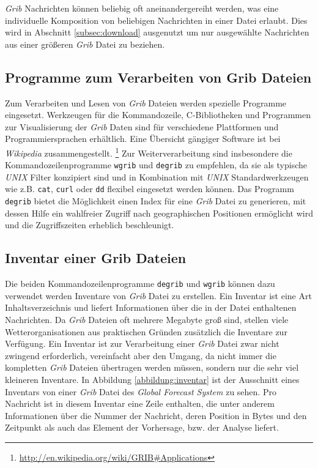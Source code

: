 \textit{Grib} Nachrichten können beliebig oft aneinandergereiht
werden, was eine individuelle Komposition von beliebigen Nachrichten
in einer Datei erlaubt. Dies wird in Abschnitt \ref{subsec:download}
ausgenutzt um nur ausgewählte Nachrichten aus einer größeren
\textit{Grib} Datei zu beziehen.

\subsection{Programme zum Verarbeiten von Grib Dateien}

Zum Verarbeiten und Lesen von \textit{Grib} Dateien werden spezielle
Programme eingesetzt. Werkzeugen für die Kommandozeile, C-Bibliotheken
und Programmen zur Visualisierung der \textit{Grib} Daten sind für
verschiedene Plattformen und Programmiersprachen erhältlich. Eine
Übersicht gängiger Software ist bei \textit{Wikipedia}
zusammengestellt.
\footnote{\url{http://en.wikipedia.org/wiki/GRIB\#Applications}} Zur
Weiterverarbeitung sind insbesondere die Kommandozeilenprogramme
\texttt{wgrib} und \texttt{degrib} zu empfehlen, da sie als typische
\textit{UNIX} Filter konzipiert sind und in Kombination mit
\textit{UNIX} Standardwerkzeugen wie z.B. \texttt{cat}, \texttt{curl}
oder \texttt{dd} flexibel eingesetzt werden können. Das Programm
\texttt{degrib} bietet die Möglichkeit einen Index für eine
\textit{Grib} Datei zu generieren, mit dessen Hilfe ein wahlfreier
Zugriff nach geographischen Positionen ermöglicht wird und die
Zugriffszeiten erheblich beschleunigt.

\subsection{Inventar einer Grib Dateien}

Die beiden Kommandozeilenprogramme \texttt{degrib} und \texttt{wgrib}
können dazu verwendet werden Inventare von \textit{Grib} Datei zu
erstellen. Ein Inventar ist eine Art Inhaltsverzeichnis und liefert
Informationen über die in der Datei enthaltenen Nachrichten. Da
\textit{Grib} Dateien oft mehrere Megabyte groß sind, stellen viele
Wetterorganisationen aus praktischen Gründen zusätzlich die Inventare
zur Verfügung. Ein Inventar ist zur Verarbeitung einer \textit{Grib}
Datei zwar nicht zwingend erforderlich, vereinfacht aber den Umgang,
da nicht immer die kompletten \textit{Grib} Dateien übertragen werden
müssen, sondern nur die sehr viel kleineren Inventare. In Abbildung
\ref{abbildung:inventar} ist der Ausschnitt eines Inventars von einer
\textit{Grib} Datei des \textit{Global Forecast System} zu sehen. Pro
Nachricht ist in diesem Inventar eine Zeile enthalten, die unter
anderem Informationen über die Nummer der Nachricht, deren Position in
Bytes und den Zeitpunkt als auch das Element der Vorhersage, bzw. der
Analyse liefert.


